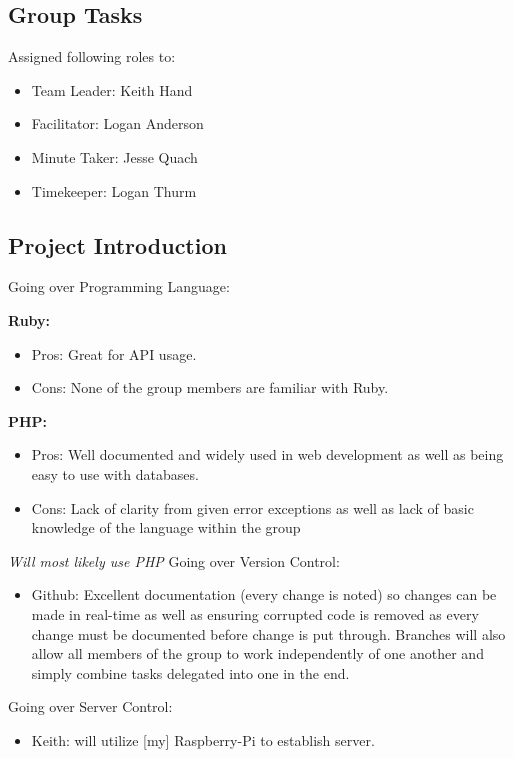 \subsection{Group Tasks}
    Assigned following roles to:
	\begin{itemize}
		\item Team Leader: Keith Hand
		\item Facilitator: Logan Anderson
		\item Minute Taker: Jesse Quach
		\item Timekeeper: Logan Thurm
    \end{itemize}

\subsection{Project Introduction}
    Going over Programming Language: \newline
	
		\textbf{Ruby:}	
		\begin{itemize}
			\item Pros: Great for API usage.
			\item Cons: None of the group members are familiar with Ruby.
		\end{itemize}
		
		\textbf{PHP:}	
		\begin{itemize}
			\item Pros: Well documented and widely used in web development as well as being easy to use with databases.
			\item Cons: Lack of clarity from given error exceptions as well as lack of basic knowledge of the language within the group
		\end{itemize}
		
	\emph{\small{Will most likely use PHP}} \newline\newline
	Going over Version Control:
	\begin{itemize}
		\item Github: Excellent documentation (every change is noted) so changes can be made in real-time
		as well as ensuring corrupted code is removed as every change must be documented before 
		change is put through. Branches will also allow all members of the group to work 
		independently of one another and simply combine tasks delegated into one in the end.
	\end{itemize}
	Going over Server Control:
	\begin{itemize}
		\item Keith: will utilize [my] Raspberry-Pi to establish server.
	\end{itemize}

